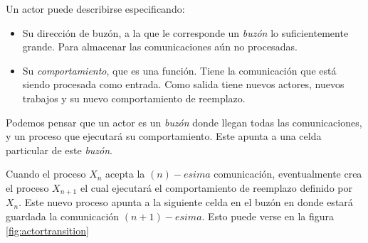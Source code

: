 
Un actor puede describirse especificando:

\begin{itemize}
 \item Su dirección de buzón, a la que le corresponde un \textit{buzón} lo suficientemente grande. Para almacenar las comunicaciones aún no procesadas.
 \item Su \textit{comportamiento}, que es una función. Tiene la comunicación que está siendo procesada como entrada. Como salida tiene nuevos actores, nuevos trabajos y su nuevo comportamiento de reemplazo.
\end{itemize}

Podemos pensar que un actor es un \textit{buzón} donde llegan todas las comunicaciones, y un proceso que ejecutará su comportamiento. Este apunta a una celda particular de este \textit{buzón}. 

% 
% 
% 
% 
% 
% 
% 
% 


Cuando el proceso $X_n$ acepta la $(n)-esima$ comunicación, eventualmente crea el proceso $X_{n+1}$ el cual ejecutará el comportamiento de reemplazo definido por $X_n$. Este nuevo proceso apunta a la siguiente celda en el buzón en donde estará guardada la comunicación $(n+1)-esima$. Esto puede verse en la figura \ref{fig:actortransition}

